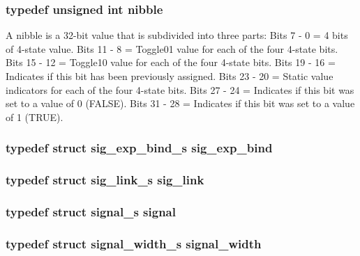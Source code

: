 \subsubsection{\setlength{\rightskip}{0pt plus 5cm}typedef unsigned int nibble}\label{defines_8h_a118}


A nibble is a 32-bit value that is subdivided into three parts: Bits 7 - 0 = 4 bits of 4-state value. Bits 11 - 8 = Toggle01 value for each of the four 4-state bits. Bits 15 - 12 = Toggle10 value for each of the four 4-state bits. Bits 19 - 16 = Indicates if this bit has been previously assigned. Bits 23 - 20 = Static value indicators for each of the four 4-state bits. Bits 27 - 24 = Indicates if this bit was set to a value of 0 (FALSE). Bits 31 - 28 = Indicates if this bit was set to a value of 1 (TRUE). 
\subsubsection{\setlength{\rightskip}{0pt plus 5cm}typedef struct {\bf sig\_\-exp\_\-bind\_\-s} sig\_\-exp\_\-bind}\label{defines_8h_a133}


\subsubsection{\setlength{\rightskip}{0pt plus 5cm}typedef struct {\bf sig\_\-link\_\-s} sig\_\-link}\label{defines_8h_a128}


\subsubsection{\setlength{\rightskip}{0pt plus 5cm}typedef struct {\bf signal\_\-s} signal}\label{defines_8h_a123}


\subsubsection{\setlength{\rightskip}{0pt plus 5cm}typedef struct {\bf signal\_\-width\_\-s} signal\_\-width}\label{defines_8h_a132}


